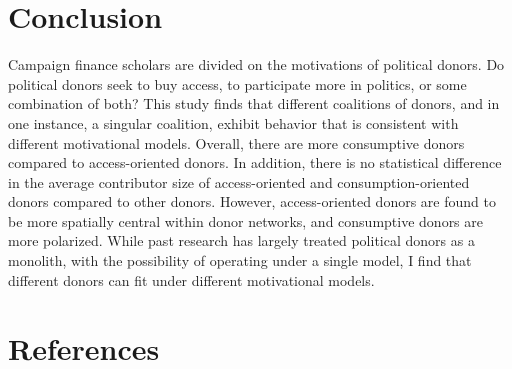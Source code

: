 \documentclass[12pt,]{article}
\begin{document}
\hypertarget{conclusion}{%
\section{Conclusion}\label{conclusion}}

Campaign finance scholars are divided on the motivations of political
donors. Do political donors seek to buy access, to participate more in
politics, or some combination of both? This study finds that different
coalitions of donors, and in one instance, a singular coalition, exhibit
behavior that is consistent with different motivational models. Overall,
there are more consumptive donors compared to access-oriented donors. In
addition, there is no statistical difference in the average contributor
size of access-oriented and consumption-oriented donors compared to
other donors. However, access-oriented donors are found to be more
spatially central within donor networks, and consumptive donors are more
polarized. While past research has largely treated political donors as a
monolith, with the possibility of operating under a single model, I find
that different donors can fit under different motivational models.

\newpage

\hypertarget{references}{%
\section{References}\label{references}}
\end{document}
